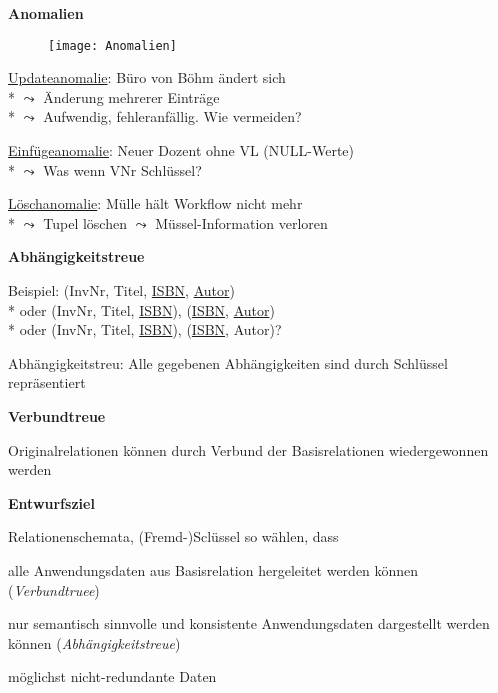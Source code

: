 \textbf{Anomalien}
\begin{figure}[H]\centering\label{Anomalien}\texttt{[image: Anomalien]}\end{figure}
\begin{items}
	\item \underline{Updateanomalie}: Büro von Böhm ändert sich \\* \( \leadsto \) Änderung mehrerer Einträge \\* \( \leadsto \) Aufwendig, fehleranfällig. Wie vermeiden?
	\item \underline{Einfügeanomalie}: Neuer Dozent ohne VL (NULL-Werte) \\* \( \leadsto \) Was wenn VNr Schlüssel?
	\item \underline{Löschanomalie}: Mülle hält Workflow nicht mehr \\* \( \leadsto \) Tupel löschen \( \leadsto \) Müssel-Information verloren
\end{items}

\textbf{Abhängigkeitstreue}
\begin{items}
	\item Beispiel: (InvNr, Titel, \underline{ISBN}, \underline{Autor}) \\* oder (InvNr, Titel, \underline{ISBN}), (\underline{ISBN}, \underline{Autor}) \\* oder (InvNr, Titel, \underline{ISBN}), (\underline{ISBN}, Autor)?	
	\item Abhängigkeitstreu: Alle gegebenen Abhängigkeiten sind durch Schlüssel repräsentiert
\end{items}

\textbf{Verbundtreue}
\begin{items}
	\item Originalrelationen können durch Verbund der Basisrelationen wiedergewonnen werden
\end{items}

\newpage

\textbf{Entwurfsziel}
\begin{items}
	\item Relationenschemata, (Fremd-)Sclüssel so wählen, dass
	\begin{enumeration}
		\item alle Anwendungsdaten aus Basisrelation hergeleitet werden können (\emph{Verbundtruee})
		\item nur semantisch sinnvolle und konsistente Anwendungsdaten dargestellt werden können (\emph{Abhängigkeitstreue})
		\item möglichst nicht-redundante Daten
	\end{enumeration}
\end{items}

